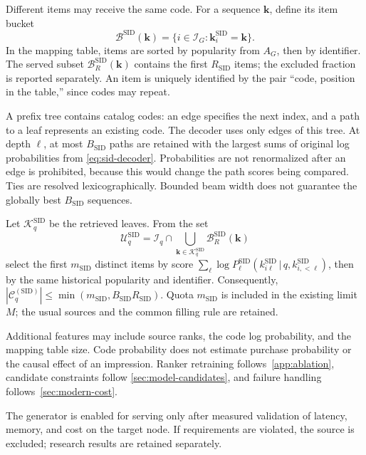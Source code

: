 \documentclass[12pt,a4paper]{article}
\newcommand{\given}{\,\vert\,}
\theoremstyle{plainru}
\begin{document}
Different items may receive the same code.
For a sequence $\mathbf k$, define its item bucket
\begin{equation}\label{eq:sid-bucket}
 \mathcal B^{\mathrm{SID}}(\mathbf k)
 =\{i\in\mathcal I_G:\mathbf k_i^{\mathrm{SID}}=\mathbf k\}.
\end{equation}
In the mapping table, items are sorted by popularity from $A_G$,
then by identifier. The served subset
$\mathcal B_R^{\mathrm{SID}}(\mathbf k)$ contains the first $R_{\mathrm{SID}}$
items; the excluded fraction is reported separately. An item is uniquely
identified by the pair ``code, position in the table,'' since codes may repeat.

A prefix tree contains catalog codes: an edge specifies the next
index, and a path to a leaf represents an existing code. The decoder uses only
edges of this tree.
At depth $\ell$, at most $B_{\mathrm{SID}}$ paths are retained
with the largest sums of original log probabilities
from \eqref{eq:sid-decoder}. Probabilities are not renormalized
after an edge is prohibited, because this would change the path scores being compared.
Ties are resolved lexicographically. Bounded beam width
does not guarantee the globally best $B_{\mathrm{SID}}$ sequences.

Let $\mathcal K_q^{\mathrm{SID}}$ be the retrieved leaves.
From the set
\begin{equation}\label{eq:sid-candidates}
 \mathcal U_q^{\mathrm{SID}}
 =\mathcal I_q\cap\bigcup_{\mathbf k\in\mathcal K_q^{\mathrm{SID}}}
                     \mathcal B_R^{\mathrm{SID}}(\mathbf k)
\end{equation}
select the first $m_{\mathrm{SID}}$ distinct items by score
$\sum_\ell\log P_\ell^{\mathrm{SID}}
(k_{i\ell}^{\mathrm{SID}}\given q,k_{i,<\ell}^{\mathrm{SID}})$,
then by the same historical popularity and identifier.
Consequently, $|\mathcal C_q^{(\mathrm{SID})}|
\le\min(m_{\mathrm{SID}},B_{\mathrm{SID}}R_{\mathrm{SID}})$.
Quota $m_{\mathrm{SID}}$ is included in the existing limit $M$;
the usual sources and the common filling rule are retained.

Additional features may include source ranks,
the code log probability, and the mapping table size. Code probability
does not estimate purchase probability or the causal effect of an impression. Ranker
retraining follows~\ref{app:ablation}, candidate constraints follow
\ref{sec:model-candidates}, and failure handling follows~\ref{sec:modern-cost}.

The generator is enabled for serving only after measured validation
of latency, memory, and cost on the target node. If requirements are violated,
the source is excluded; research results are retained separately.
\end{document}
